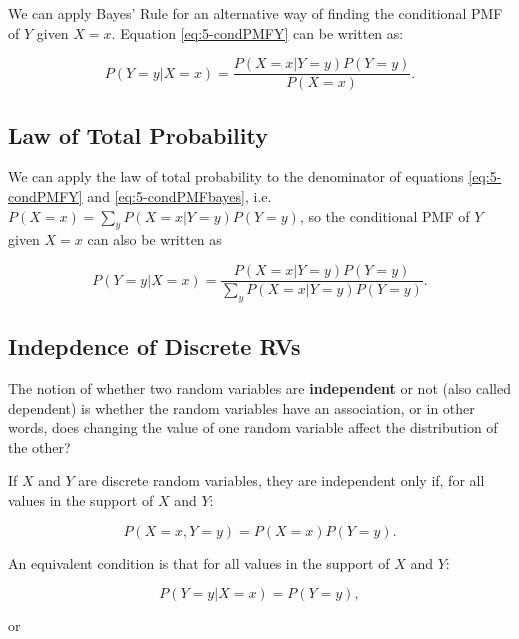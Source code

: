 \documentclass[
]{book}
\begin{document}
We can apply Bayes' Rule for an alternative way of finding the conditional PMF of \(Y\) given \(X=x\). Equation \eqref{eq:5-condPMFY} can be written as:

\begin{equation} 
P(Y=y|X=x) = \frac{P(X=x|Y=y) P(Y=y)}{P(X=x)}.
\label{eq:5-condPMFbayes}
\end{equation}

\hypertarget{law-of-total-probability-1}{%
\subsection{Law of Total Probability}\label{law-of-total-probability-1}}

We can apply the law of total probability to the denominator of equations \eqref{eq:5-condPMFY} and \eqref{eq:5-condPMFbayes}, i.e.~\(P(X=x) = \sum_y P(X=x|Y=y) P(Y=y)\), so the conditional PMF of \(Y\) given \(X=x\) can also be written as

\begin{equation} 
P(Y=y|X=x) = \frac{P(X=x|Y=y) P(Y=y)}{\sum_y P(X=x|Y=y) P(Y=y)}.
\label{eq:5-condPMFtotal}
\end{equation}

\hypertarget{indepdence-of-discrete-rvs}{%
\subsection{Indepdence of Discrete RVs}\label{indepdence-of-discrete-rvs}}

The notion of whether two random variables are \textbf{independent} or not (also called dependent) is whether the random variables have an association, or in other words, does changing the value of one random variable affect the distribution of the other?

If \(X\) and \(Y\) are discrete random variables, they are independent only if, for all values in the support of \(X\) and \(Y\):

\begin{equation} 
P(X=x, Y=y) = P(X=x) P(Y=y).
\label{eq:5-ind}
\end{equation}

An equivalent condition is that for all values in the support of \(X\) and \(Y\):

\begin{equation} 
P(Y=y | X=x) = P(Y=y),
\label{eq:5-ind2}
\end{equation}

or
\end{document}
